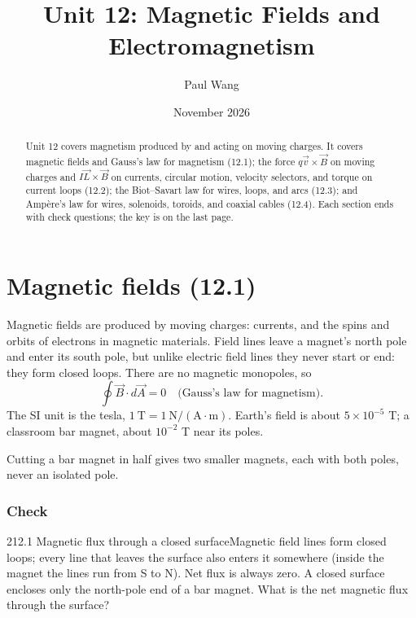 \documentclass[11pt]{article}
\title{Unit 12: Magnetic Fields and Electromagnetism}
\author{Paul Wang}
\date{November 2026}
\begin{document}
\maketitle

\begin{abstract}
Unit 12 covers magnetism produced by and acting on moving charges. It covers magnetic fields and Gauss's law for magnetism (12.1); the force $q\vec v\times\vec B$ on moving charges and $I\vec L\times\vec B$ on currents, circular motion, velocity selectors, and torque on current loops (12.2); the Biot--Savart law for wires, loops, and arcs (12.3); and Ampère's law for wires, solenoids, toroids, and coaxial cables (12.4). Each section ends with check questions; the key is on the last page.
\end{abstract}


\section{Magnetic fields (12.1)}\label{sec:1}

Magnetic fields are produced by moving charges: currents, and the spins and orbits of electrons in magnetic materials. Field lines leave a magnet's north pole and enter its south pole, but unlike electric field lines they never start or end: they form closed loops. There are no magnetic monopoles, so
\[ \oint\vec B\cdot d\vec A = 0 \quad \text{(Gauss's law for magnetism)}. \]
The SI unit is the tesla, $1\ \mathrm{T} = 1\ \mathrm{N/(A\cdot m)}$. Earth's field is about $5\times10^{-5}$ T; a classroom bar magnet, about $10^{-2}$ T near its poles.
\begin{trap}
Cutting a bar magnet in half gives two smaller magnets, each with both poles, never an isolated pole.
\end{trap}

\subsubsection{Check}\mbox{}

\begin{q}{2}{12.1 Magnetic flux through a closed surface}{Magnetic field lines form closed loops; every line that leaves the surface also enters it somewhere (inside the magnet the lines run from S to N). Net flux is always zero.}
A closed surface encloses only the north-pole end of a bar magnet. What is the net magnetic flux through the surface?
\end{q}
\end{document}
